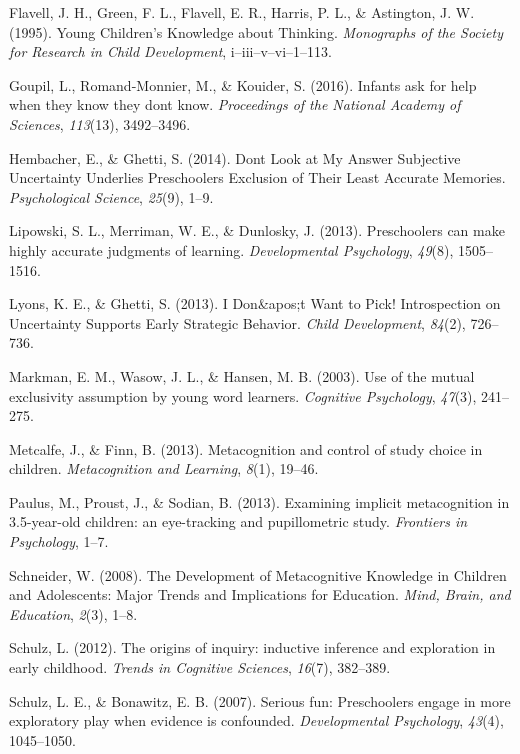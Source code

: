 \documentclass[10pt, letterpaper]{article}
\begin{document}
\hypertarget{ref-Flavell1995}{}
Flavell, J. H., Green, F. L., Flavell, E. R., Harris, P. L., \&
Astington, J. W. (1995). Young Children's Knowledge about Thinking.
\emph{Monographs of the Society for Research in Child Development},
i--iii--v--vi--1--113.

\hypertarget{ref-Goupil2016}{}
Goupil, L., Romand-Monnier, M., \& Kouider, S. (2016). Infants ask for
help when they know they dont know. \emph{Proceedings of the National
Academy of Sciences}, \emph{113}(13), 3492--3496.

\hypertarget{ref-Hembacher2014}{}
Hembacher, E., \& Ghetti, S. (2014). Dont Look at My Answer Subjective
Uncertainty Underlies Preschoolers Exclusion of Their Least Accurate
Memories. \emph{Psychological Science}, \emph{25}(9), 1--9.

\hypertarget{ref-Lipowski2013}{}
Lipowski, S. L., Merriman, W. E., \& Dunlosky, J. (2013). Preschoolers
can make highly accurate judgments of learning. \emph{Developmental
Psychology}, \emph{49}(8), 1505--1516.

\hypertarget{ref-Lyons2013}{}
Lyons, K. E., \& Ghetti, S. (2013). I Don\&apos;t Want to Pick!
Introspection on Uncertainty Supports Early Strategic Behavior.
\emph{Child Development}, \emph{84}(2), 726--736.

\hypertarget{ref-Markman2003}{}
Markman, E. M., Wasow, J. L., \& Hansen, M. B. (2003). Use of the mutual
exclusivity assumption by young word learners. \emph{Cognitive
Psychology}, \emph{47}(3), 241--275.

\hypertarget{ref-Metcalfe2013}{}
Metcalfe, J., \& Finn, B. (2013). Metacognition and control of study
choice in children. \emph{Metacognition and Learning}, \emph{8}(1),
19--46.

\hypertarget{ref-Paulus2013}{}
Paulus, M., Proust, J., \& Sodian, B. (2013). Examining implicit
metacognition in 3.5-year-old children: an eye-tracking and
pupillometric study. \emph{Frontiers in Psychology}, 1--7.

\hypertarget{ref-Schneider2008}{}
Schneider, W. (2008). The Development of Metacognitive Knowledge in
Children and Adolescents: Major Trends and Implications for Education.
\emph{Mind, Brain, and Education}, \emph{2}(3), 1--8.

\hypertarget{ref-Schulz2012}{}
Schulz, L. (2012). The origins of inquiry: inductive inference and
exploration in early childhood. \emph{Trends in Cognitive Sciences},
\emph{16}(7), 382--389.

\hypertarget{ref-Schulz2007}{}
Schulz, L. E., \& Bonawitz, E. B. (2007). Serious fun: Preschoolers
engage in more exploratory play when evidence is confounded.
\emph{Developmental Psychology}, \emph{43}(4), 1045--1050.
\end{document}
